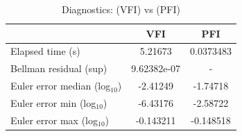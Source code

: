 \begin{table}[!ht]
\label{ref:table_Q2b}
\centering
\caption{Diagnostics:  (VFI) vs (PFI)}
\begin{tabular}{lcc}
\hline\hline
 & \textbf{VFI} & \textbf{PFI} \\
\hline
Elapsed time (s) & 5.21673 & 0.0373483 \\
Bellman residual (sup) & 9.62382e-07 & - \\
Euler error median (log$_{10}$) & -2.41249 & -1.74718 \\
Euler error min (log$_{10}$) & -6.43176 & -2.58722 \\
Euler error max (log$_{10}$) & -0.143211 & -0.148518 \\
\hline\hline
\end{tabular}
\end{table}
